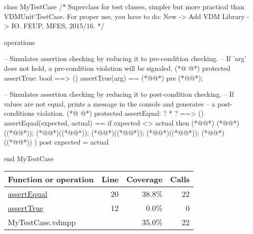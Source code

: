 \begin{vdmpp}[breaklines=true]
class MyTestCase
/*
  Superclass for test classes, simpler but more practical than VDMUnit`TestCase. 
  For proper use, you have to do: New -> Add VDM Library -> IO.
  FEUP, MFES, 2015/16.
*/

operations

 -- Simulates assertion checking by reducing it to pre-condition checking.
 -- If 'arg' does not hold, a pre-condition violation will be signaled.
(*@
\label{assertTrue:12}
@*)
 protected assertTrue: bool ==> ()
 assertTrue(arg) == 
  (*@@*) 
 pre (*@@*);
  
 -- Simulates assertion checking by reducing it to post-condition checking.
 -- If values are not equal, prints a message in the console and generates 
 -- a post-conditions violation.
(*@
\label{assertEqual:20}
@*)
 protected assertEqual: ? * ? ==> ()
 assertEqual(expected, actual) == 
  if expected <> actual then (*@\vdmnotcovered{(}@*)
    (*@@*)((*@@*));
    (*@@*)((*@@*)); 
    (*@@*)((*@@*));
    (*@@*)((*@@*));
    (*@@*)((*@@*))
  )
 post expected = actual
  
end MyTestCase
\end{vdmpp}
\bigskip
\begin{longtable}{|l|r|r|r|}
\hline
Function or operation & Line & Coverage & Calls \\
\hline
\hline
\hyperref[assertEqual:20]{assertEqual} & 20&38.8\% & 22 \\
\hline
\hyperref[assertTrue:12]{assertTrue} & 12&0.0\% & 0 \\
\hline
\hline
MyTestCase.vdmpp & & 35.0\% & 22 \\
\hline
\end{longtable}

